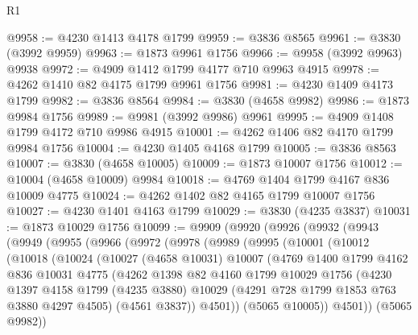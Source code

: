 \begin{lexlean}{R1}
\begin{coremodule}
@9958 := @4230 @1413 @4178 @1799
@9959 := @3836 @8565
@9961 := @3830 (@3992 @9959)
@9963 := @1873 @9961 @1756
@9966 := @9958 (@3992 @9963) @9938
@9972 := @4909 @1412 @1799 @4177 @710 @9963 @4915
@9978 := @4262 @1410 @82 @4175 @1799 @9961 @1756
@9981 := @4230 @1409 @4173 @1799
@9982 := @3836 @8564
@9984 := @3830 (@4658 @9982)
@9986 := @1873 @9984 @1756
@9989 := @9981 (@3992 @9986) @9961
@9995 := @4909 @1408 @1799 @4172 @710 @9986 @4915
@10001 := @4262 @1406 @82 @4170 @1799 @9984 @1756
@10004 := @4230 @1405 @4168 @1799
@10005 := @3836 @8563
@10007 := @3830 (@4658 @10005)
@10009 := @1873 @10007 @1756
@10012 := @10004 (@4658 @10009) @9984
@10018 := @4769 @1404 @1799 @4167 @836 @10009 @4775
@10024 := @4262 @1402 @82 @4165 @1799 @10007 @1756
@10027 := @4230 @1401 @4163 @1799
@10029 := @3830 (@4235 @3837)
@10031 := @1873 @10029 @1756
@10099 := @9909
    (@9920
      (@9926
        (@9932
          (@9943
            (@9949
              (@9955
                (@9966
                  (@9972
                    (@9978
                      (@9989
                        (@9995
                          (@10001
                            (@10012
                              (@10018
                                (@10024
                                  (@10027
                                    (@4658 @10031)
                                    @10007
                                    (@4769
                                      @1400
                                      @1799
                                      @4162
                                      @836
                                      @10031
                                      @4775
                                      (@4262
                                        @1398
                                        @82
                                        @4160
                                        @1799
                                        @10029
                                        @1756
                                        (@4230
                                          @1397
                                          @4158
                                          @1799
                                          (@4235 @3880)
                                          @10029
                                          (@4291 @728 @1799 @1853 @763 @3880 @4297 @4505)
                                          (@4561 @3837))
                                        @4501))
                                    (@5065 @10005))
                                  @4501))
                              (@5065 @9982))

\end{coremodule}
\end{lexlean}
